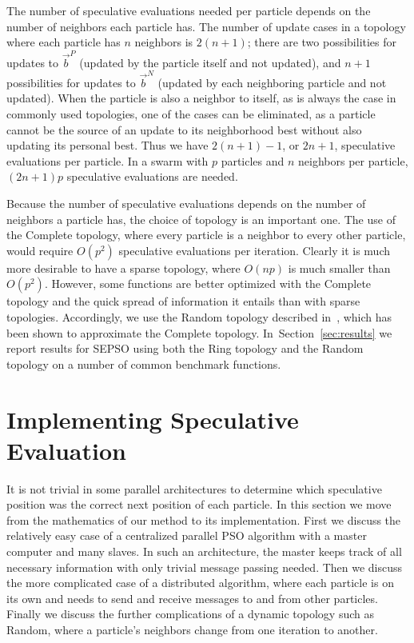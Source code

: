 \documentclass[smallcondensed]{svjour3}
\renewcommand{\sec}[1]{Section~\ref{sec:#1}}
\providecommand{\pers}{\ensuremath{P}}
\providecommand{\neigh}{\ensuremath{N}}
\providecommand{\nbest}{\ensuremath{\Vec{b}^\neigh}}
\providecommand{\pbest}{\ensuremath{\Vec{b}^\pers}}
\begin{document}
The number of speculative evaluations needed per particle depends on the number
of neighbors each particle has.  The number of update cases in a topology where
each particle has $n$ neighbors is $2(n+1)$; there are two possibilities for
updates to $\pbest$ (updated by the particle itself and not updated), and $n+1$
possibilities for updates to $\nbest$ (updated by each neighboring particle and
not updated).  When the particle is also a neighbor to itself, as is always the
case in commonly used topologies, one of the cases can be eliminated, as a
particle cannot be the source of an update to its neighborhood best without
also updating its personal best.  Thus we have $2(n+1)-1$, or $2n+1$,
speculative evaluations per particle.  In a swarm with $p$ particles and $n$
neighbors per particle, $(2n+1)p$ speculative evaluations are needed.

Because the number of speculative evaluations depends on the number of
neighbors a particle has, the choice of topology is an important one.  The use
of the Complete topology, where every particle is a neighbor to every other
particle, would require $O(p^2)$ speculative evaluations per iteration.
Clearly it is much more desirable to have a sparse topology, where $O(np)$ is
much smaller than $O(p^2)$.  However, some functions are better optimized with
the Complete topology and the quick spread of information it entails than with
sparse topologies.  Accordingly, we use the Random topology described
in~\citep{mcnabb-2009-large-particle-swarms}, which has been shown to
approximate the Complete topology.  In~\sec{results} we report results for
SEPSO using both the Ring topology and the Random topology on a number of
common benchmark functions.

\section{Implementing Speculative Evaluation}
\label{sec:implementation}

It is not trivial in some parallel architectures to determine which speculative
position was the correct next position of each particle.  In this section we
move from the mathematics of our method to its implementation.  First we
discuss the relatively easy case of a centralized parallel PSO algorithm with a
master computer and many slaves.  In such an architecture, the master keeps
track of all necessary information with only trivial message passing needed.
Then we discuss the more complicated case of a distributed algorithm, where
each particle is on its own and needs to send and receive messages to and from
other particles.  Finally we discuss the further complications of a dynamic
topology such as Random, where a particle's neighbors change from one iteration
to another.
\end{document}
